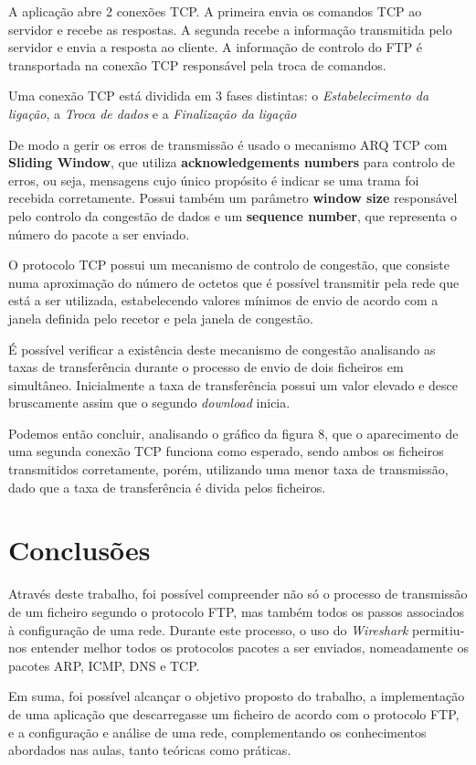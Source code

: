 \documentclass[11pt]{article}
\begin{document}
A aplicação abre 2 conexões TCP. A primeira envia os comandos TCP ao servidor e recebe as respostas. A segunda recebe a informação transmitida pelo servidor e envia a resposta ao cliente. A informação de controlo do FTP é transportada na conexão TCP responsável pela troca de comandos.

Uma conexão TCP está dividida em 3 fases distintas: o \emph{Estabelecimento da ligação}, a \emph{Troca de dados} e a \emph{Finalização da ligação}


De modo a gerir os erros de transmissão é usado o mecanismo ARQ TCP com \textbf{Sliding Window}, que utiliza \textbf{acknowledgements numbers} para controlo de erros, ou seja, mensagens cujo único propósito é indicar se uma trama foi recebida corretamente. Possui também um parâmetro \textbf{window size} responsável pelo controlo da congestão de dados e um \textbf{sequence number}, que representa o número do pacote a ser enviado.

O protocolo TCP possui um mecanismo de controlo de congestão, que consiste numa aproximação do número de octetos que é possível transmitir pela rede que está a ser utilizada, estabelecendo valores mínimos de envio de acordo com a janela definida pelo recetor e pela janela de congestão.

É possível verificar a existência deste mecanismo de congestão analisando as taxas de transferência durante o processo de envio de dois ficheiros em simultâneo. Inicialmente a taxa de transferência possui um valor elevado e desce bruscamente assim que o segundo \textit{download} inicia.

Podemos então concluir, analisando o gráfico da figura 8, que o aparecimento de uma segunda conexão TCP funciona como esperado, sendo ambos os ficheiros transmitidos corretamente, porém, utilizando uma menor taxa de transmissão, dado que a taxa de transferência é divida pelos ficheiros.


\section{Conclusões}

Através deste trabalho, foi possível compreender não só o processo de transmissão de um ficheiro segundo o protocolo FTP, mas também todos os passos associados à configuração de uma rede. Durante este processo, o uso do \textit{Wireshark} permitiu-nos entender melhor todos os protocolos pacotes a ser enviados, nomeadamente os pacotes ARP, ICMP, DNS e TCP.

Em suma, foi possível alcançar o objetivo proposto do trabalho, a implementação de uma aplicação que descarregasse um ficheiro de acordo com o protocolo FTP, e a configuração e análise de uma rede, complementando os conhecimentos abordados nas aulas, tanto teóricas como práticas.
\end{document}
